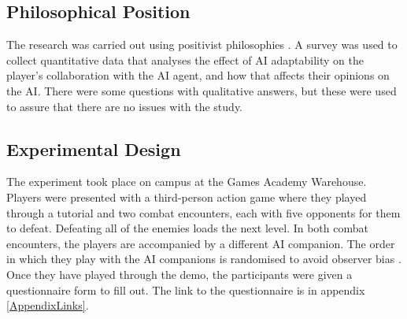 \documentclass{IEEEtran}
\begin{document}
\subsection{Philosophical Position}
\label{PhilosophicalPosition}



The research was carried out using positivist philosophies \cite{Zukauskas18}. A survey was used to collect quantitative data that analyses the effect of AI adaptability on the player's collaboration with the AI agent, and how that affects their opinions on the AI. There were some questions with qualitative answers, but these were used to assure that there are no issues with the study.

\subsection{Experimental Design}
\label{ExperimentalDesign}



The experiment took place on campus at the Games Academy Warehouse. Players were presented with a third-person action game where they played through a tutorial and two combat encounters, each with five opponents for them to defeat. Defeating all of the enemies loads the next level. In both combat encounters, the players are accompanied by a different AI companion. The order in which they play with the AI companions is randomised to avoid observer bias \cite{hrobjartsson2013observer}. Once they have played through the demo, the participants were given a questionnaire form to fill out. The link to the questionnaire is in appendix \ref{AppendixLinks}.
\end{document}
